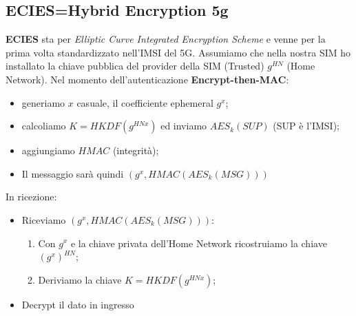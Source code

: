 \documentclass{book}
\begin{document}
\subsection{ECIES=Hybrid Encryption 5g}
\textbf{ECIES} sta per \emph{Elliptic Curve Integrated Encryption Scheme} e venne per la prima volta standardizzato nell'IMSI del 5G\@. Assumiamo che nella nostra SIM ho installato la chiave pubblica del provider della SIM (Trusted) \(g^{HN}\) (Home Network)\@. Nel momento dell'autenticazione \textbf{Encrypt-then-MAC}:\begin{itemize}
    \item generiamo \(x\) casuale, il coefficiente ephemeral \(g^{x}\);
    \item calcoliamo \(K=HKDF(g^{HNx})\) ed inviamo \(AES_{k}(SUP)\) (SUP è l'IMSI);
    \item aggiungiamo \(HMAC\) (integrità);
    \item Il messaggio sarà quindi \(({g}^{x},HMAC(AES_{k}(MSG)))\)
\end{itemize}
In ricezione:\begin{itemize}
    \item Riceviamo \(({g}^{x},HMAC(AES_{k}(MSG)))\):\begin{enumerate}
              \item Con \({g}^{x}\) e la chiave privata dell'Home Network ricostruiamo la chiave \({(g^{x})}^{HN}\);
              \item Deriviamo la chiave \(K=HKDF(g^{HNx})\);
          \end{enumerate}
    \item Decrypt il dato in ingresso
\end{itemize}
\end{document}
